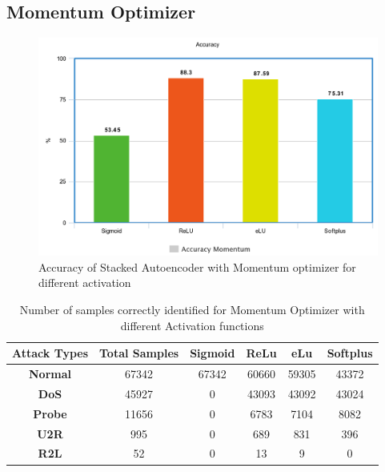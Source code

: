 \documentclass[12pt, a4paper]{report}
\begin{document}
\begin{appendices}

\section {Momentum Optimizer}
\begin{figure}[ht]
\centering
\captionsetup{justification=centering,margin=2cm}
\includegraphics[width=13cm]{accuracy_momentum_tflearn.png}
\caption{ Accuracy of Stacked Autoencoder with Momentum optimizer for different activation }
\label{fig:acc_Momentum}
\end{figure}
\clearpage
\begin{table}[h]
\centering
\captionsetup{justification=centering,margin=2cm}
\begin{tabular}{|c|c|c|c|c|c|}
\hline
\textbf{Attack Types} & \textbf{Total Samples} & \textbf{Sigmoid} & \textbf{ReLu} & \textbf{eLu} & \textbf{Softplus} \\ \hline
\textbf{Normal}       & 67342                  & 67342            & 60660         & 59305        & 43372             \\ \hline
\textbf{DoS}          & 45927                  & 0          		  & 43093         & 43092        & 43024             \\ \hline
\textbf{Probe}        & 11656                  & 0           		  & 6783          & 7104         & 8082              \\ \hline
\textbf{U2R}          & 995                    & 0              		& 689           & 831          & 396               \\ \hline
\textbf{R2L}          & 52                     & 0               		& 13            & 9           & 0                \\ \hline
\end{tabular}
\caption{Number of samples correctly identified for Momentum Optimizer with different Activation functions}
\label{confusion_Momentum}
\end{table}

\end{appendices}
\end{document}

